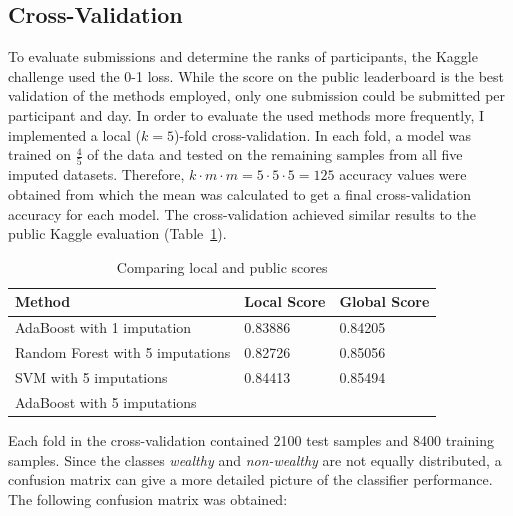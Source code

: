 \documentclass[a4paper]{article}
\begin{document}
\subsection{Cross-Validation}
\label{sec:cross}

To evaluate submissions and determine the ranks of participants, the
Kaggle challenge used the 0-1 loss. While the score on the public
leaderboard is the best validation of the methods employed, only one
submission could be submitted per participant and day. In order to
evaluate the used methods more frequently, I implemented a local
($k = 5$)-fold cross-validation. In each fold, a model was trained on
$\frac{4}{5}$ of the data and tested on the remaining samples from all
five imputed datasets. Therefore,
$k \cdot m \cdot m = 5 \cdot 5 \cdot 5 = 125$ accuracy values were
obtained from which the mean was calculated to get a final
cross-validation accuracy for each model. The cross-validation
achieved similar results to the public Kaggle evaluation
(Table~\ref{tab:localpublic}).

\begin{table}[h]
  \centering
  \begin{tabular}{lll}
    \toprule
    Method & Local Score & Global Score\\
    \midrule
    AdaBoost with 1 imputation & 0.83886 & 0.84205\\
    Random Forest with 5 imputations & 0.82726 & 0.85056\\
    SVM with 5 imputations & 0.84413 & 0.85494\\
    AdaBoost with 5 imputations & & \\
    \bottomrule
  \end{tabular}
  \caption{{Comparing local and public scores}}
  \label{tab:localpublic}
\end{table}

Each fold in the cross-validation contained 2100 test samples and
8400 training samples. Since the classes \emph{wealthy} and
\emph{non-wealthy} are not equally distributed, a confusion matrix can
give a more detailed picture of the classifier performance. The
following confusion matrix was obtained:
\end{document}
